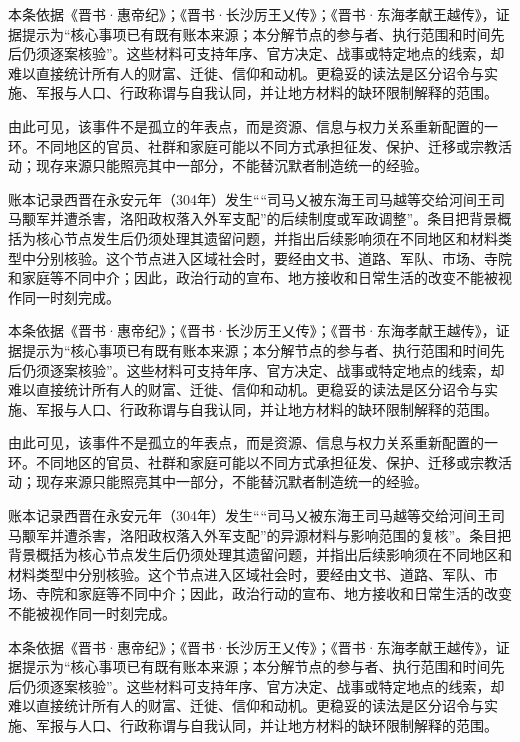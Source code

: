 本条依据《晋书·惠帝纪》；《晋书·长沙厉王乂传》；《晋书·东海孝献王越传》，证据提示为“核心事项已有既有账本来源；本分解节点的参与者、执行范围和时间先后仍须逐案核验”。这些材料可支持年序、官方决定、战事或特定地点的线索，却难以直接统计所有人的财富、迁徙、信仰和动机。更稳妥的读法是区分诏令与实施、军报与人口、行政称谓与自我认同，并让地方材料的缺环限制解释的范围。

由此可见，该事件不是孤立的年表点，而是资源、信息与权力关系重新配置的一环。不同地区的官员、社群和家庭可能以不同方式承担征发、保护、迁移或宗教活动；现存来源只能照亮其中一部分，不能替沉默者制造统一的经验。

账本记录西晋在永安元年（304年）发生““司马乂被东海王司马越等交给河间王司马颙军并遭杀害，洛阳政权落入外军支配”的后续制度或军政调整”。条目把背景概括为核心节点发生后仍须处理其遗留问题，并指出后续影响须在不同地区和材料类型中分别核验。这个节点进入区域社会时，要经由文书、道路、军队、市场、寺院和家庭等不同中介；因此，政治行动的宣布、地方接收和日常生活的改变不能被视作同一时刻完成。

本条依据《晋书·惠帝纪》；《晋书·长沙厉王乂传》；《晋书·东海孝献王越传》，证据提示为“核心事项已有既有账本来源；本分解节点的参与者、执行范围和时间先后仍须逐案核验”。这些材料可支持年序、官方决定、战事或特定地点的线索，却难以直接统计所有人的财富、迁徙、信仰和动机。更稳妥的读法是区分诏令与实施、军报与人口、行政称谓与自我认同，并让地方材料的缺环限制解释的范围。

由此可见，该事件不是孤立的年表点，而是资源、信息与权力关系重新配置的一环。不同地区的官员、社群和家庭可能以不同方式承担征发、保护、迁移或宗教活动；现存来源只能照亮其中一部分，不能替沉默者制造统一的经验。

账本记录西晋在永安元年（304年）发生““司马乂被东海王司马越等交给河间王司马颙军并遭杀害，洛阳政权落入外军支配”的异源材料与影响范围的复核”。条目把背景概括为核心节点发生后仍须处理其遗留问题，并指出后续影响须在不同地区和材料类型中分别核验。这个节点进入区域社会时，要经由文书、道路、军队、市场、寺院和家庭等不同中介；因此，政治行动的宣布、地方接收和日常生活的改变不能被视作同一时刻完成。

本条依据《晋书·惠帝纪》；《晋书·长沙厉王乂传》；《晋书·东海孝献王越传》，证据提示为“核心事项已有既有账本来源；本分解节点的参与者、执行范围和时间先后仍须逐案核验”。这些材料可支持年序、官方决定、战事或特定地点的线索，却难以直接统计所有人的财富、迁徙、信仰和动机。更稳妥的读法是区分诏令与实施、军报与人口、行政称谓与自我认同，并让地方材料的缺环限制解释的范围。

